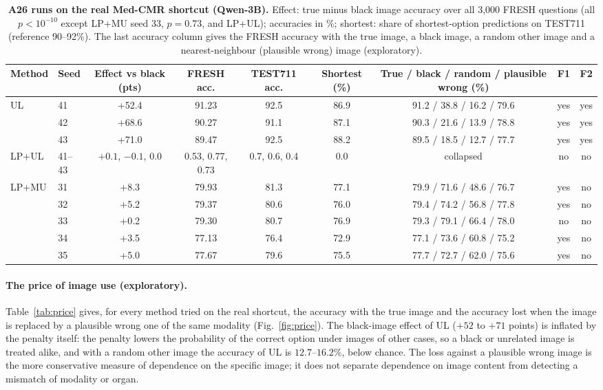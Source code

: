 \begin{table}[t]
  \centering
  \footnotesize
  \setlength{\tabcolsep}{4pt}
  \begin{tabular}{@{}llccccccc@{}}
    \toprule
    Method & Seed & Effect vs black (pts) & FRESH acc. & TEST711 acc. & Shortest (\%) & True / black / random / plausible wrong (\%) & F1 & F2 \\
    \midrule
    UL & 41 & +52.4 & 91.23 & 92.5 & 86.9 & 91.2 / 38.8 / 16.2 / 79.6 & yes & yes \\
     & 42 & +68.6 & 90.27 & 91.1 & 87.1 & 90.3 / 21.6 / 13.9 / 78.8 & yes & yes \\
     & 43 & +71.0 & 89.47 & 92.5 & 88.2 & 89.5 / 18.5 / 12.7 / 77.7 & yes & yes \\
    LP+UL & 41--43 & $+0.1$, $-0.1$, 0.0 & 0.53, 0.77, 0.73 & 0.7, 0.6, 0.4 & 0.0 & collapsed & no & no \\
    LP+MU & 31 & +8.3 & 79.93 & 81.3 & 77.1 & 79.9 / 71.6 / 48.6 / 76.7 & yes & no \\
     & 32 & +5.2 & 79.37 & 80.6 & 76.0 & 79.4 / 74.2 / 56.8 / 77.8 & yes & no \\
     & 33 & +0.2 & 79.30 & 80.7 & 76.9 & 79.3 / 79.1 / 66.4 / 78.0 & no & no \\
     & 34 & +3.5 & 77.13 & 76.4 & 72.9 & 77.1 / 73.6 / 60.8 / 75.2 & yes & no \\
     & 35 & +5.0 & 77.67 & 79.6 & 75.5 & 77.7 / 72.7 / 62.0 / 75.6 & yes & no \\
    \bottomrule
  \end{tabular}
  \caption{\textbf{A26 runs on the real Med-CMR shortcut (Qwen-3B).} Effect: true minus black image accuracy over all 3{,}000 FRESH questions (all $p<10^{-10}$ except LP+MU seed 33, $p=0.73$, and LP+UL); accuracies in \%; shortest: share of shortest-option predictions on TEST711 (reference 90--92\%). The last accuracy column gives the FRESH accuracy with the true image, a black image, a random other image and a nearest-neighbour (plausible wrong) image (exploratory).}
  \label{tab:a26}
\end{table}

\paragraph{The price of image use (exploratory).}
Table~\ref{tab:price} gives, for every method tried on the real shortcut, the accuracy with the true image and the accuracy lost when the image is replaced by a plausible wrong one of the same modality (Fig.~\ref{fig:price}).
The black-image effect of UL ($+52$ to $+71$ points) is inflated by the penalty itself: the penalty lowers the probability of the correct option under images of other cases, so a black or unrelated image is treated alike, and with a random other image the accuracy of UL is $12.7$--$16.2\%$, below chance.
The loss against a plausible wrong image is the more conservative measure of dependence on the specific image; it does not separate dependence on image content from detecting a mismatch of modality or organ.

